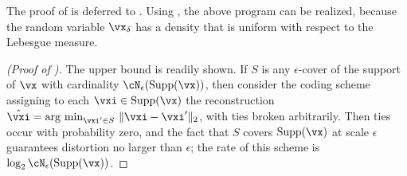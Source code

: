 \documentclass[../../book-main.tex]{subfiles}
\begin{document}
The proof of  is deferred to
.
Using , the above program can be realized,
because the random variable $\vx_{\delta}$ has a density that is uniform with
respect to the Lebesgue measure.

\begin{proof}[(Proof of )]
    The upper bound is readily shown. If $S$ is any $\epsilon$-cover of the
    support of $\vx$ with cardinality $\cN_{\epsilon}(\Supp(\vx))$, then consider the
    coding scheme assigning to each $\vxi \in \Supp(\vx)$ the reconstruction
    $\hat{\vxi} = \argmin_{\vxi' \in S}\, \norm{\vxi - \vxi'}_2$, with ties
    broken arbitrarily. Then ties occur with probability zero, and the fact that
    $S$ covers $\Supp(\vx)$ at scale $\epsilon$ guarantees distortion no larger
    than $\epsilon$; the rate of this scheme is $\log_2 \cN_{\epsilon}(\Supp(\vx))$.


\end{proof}
\end{document}
